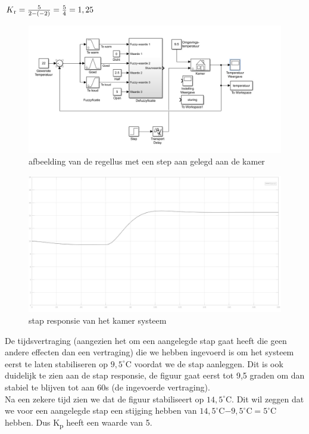 \documentclass[a4paper, 12pt]{article}
\begin{document}
$K\textsubscript{r} = \frac{5}{2-(-2)} = \frac{5}{4} = 1,25$ \\

\begin{figure}[!h]
	\includegraphics[width=1\linewidth]{Labo4_1_regellus_kamer_kp.jpg}
	\caption{afbeelding van de regellus met een step aan gelegd aan de kamer}
\end{figure}

\begin{figure}[!h]
	\includegraphics[width=1\linewidth]{Labo4_1_step_response_kamer.jpg}
	\caption{stap responsie van het kamer systeem}
\end{figure}

\newpage

De tijdsvertraging (aangezien het om een aangelegde stap gaat heeft die geen andere effecten dan een vertraging) die we hebben ingevoerd is om het systeem eerst te laten stabiliseren op $9,5^\circ$C voordat we de stap aanleggen. Dit is ook duidelijk te zien aan de stap responsie, de figuur gaat eerst tot 9,5 graden om dan stabiel te blijven tot aan 60s (de ingevoerde vertraging).\\
Na een zekere tijd zien we dat de figuur stabiliseert op $14,5^\circ$C. Dit wil zeggen dat we voor een aangelegde stap een stijging hebben van $14,5^\circ$C$ - 9,5^\circ$C$ = 5^\circ$C hebben. Dus K\textsubscript{p} heeft een waarde van 5. \\
\end{document}
